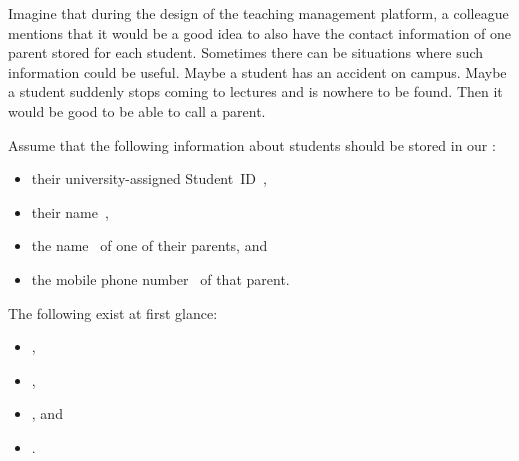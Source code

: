 %
%
Imagine that during the design of the teaching management platform, a colleague mentions that it would be a good idea to also have the contact information of one parent stored for each student.
Sometimes there can be situations where such information could be useful.
Maybe a student has an accident on campus.
Maybe a student suddenly stops coming to lectures and is nowhere to be found.
Then it would be good to be able to call a parent.

Assume that the following information about students should be stored in our \db:%
\begin{itemize}%
\item their university-assigned Student~ID~,%
\item their name~,%
\item the name~ of one of their parents, and%
\item the mobile phone number~ of that parent.%
\end{itemize}%
%
The following  exist at first glance:%
%
\begin{itemize}%
\item {}, %
\item {}, %
\item {}, and %
\item {}.
\end{itemize}%
%
%
%
%
\endhsection%
%
